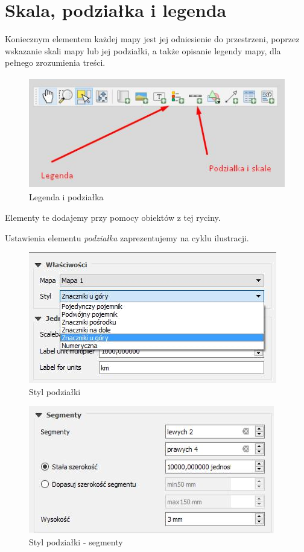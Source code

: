 \documentclass[12pt,a4paper]{book}
\begin{document}
\section{Skala, podziałka i legenda}
Koniecznym elementem każdej mapy jest jej odniesienie do przestrzeni, poprzez wskazanie skali mapy lub jej podziałki, a także opisanie legendy mapy, dla pełnego zrozumienia treści.



\begin{center}
\begin{figure}
\includegraphics[width=11.642cm,height=4.893cm]{008-legenda.jpg}
\caption{Legenda i podziałka}
\end{figure}
\end{center}
Elementy te dodajemy przy pomocy obiektów z tej ryciny.

Ustawienia elementu \textit{podziałka} zaprezentujemy na cyklu ilustracji.

\begin{center}
\begin{figure}
\includegraphics[width=10.851cm,height=5.743cm]{008-podzialka-styl.png}
\caption{Styl podziałki}
\end{figure}
\end{center}


\begin{center}
\begin{figure}
\includegraphics[width=10.746cm,height=5.581cm]{008-podzialka-segmenty.jpg}
\caption{Styl podziałki - segmenty}
\end{figure}
\end{center}
\end{document}
